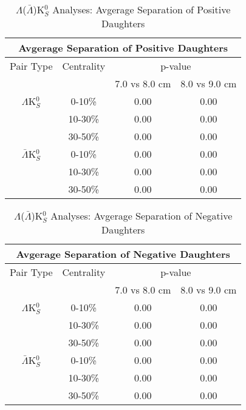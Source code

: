 \documentclass[../AnalysisNoteJBuxton.tex]{subfiles}
\begin{document}
\begin{table}
 \centering
 \begin{tabular}{|c|c|c|c|}
 \multicolumn{4}{c}{Avgerage Separation of Positive Daughters} \\
  \hline
  Pair Type & Centrality & \multicolumn{2}{c|}{p-value} \\
  \cline{3-4}
   & & 7.0 vs 8.0 cm & 8.0 vs 9.0 cm \\
  \hline
  $\Lambda$K$^{0}_{S}$ & 0-10\% & 0.00 & 0.00 \\
   & 10-30\% & 0.00 & 0.00 \\
   & 30-50\% & 0.00 & 0.00 \\
  \hline
  $\bar{\Lambda}$K$^{0}_{S}$ & 0-10\% & 0.00 & 0.00 \\
   & 10-30\% & 0.00 & 0.00 \\
   & 30-50\% & 0.00 & 0.00 \\
  \hline
 \end{tabular}
 \caption{$\Lambda$($\bar{\Lambda}$)K$^{0}_{S}$ Analyses: Avgerage Separation of Positive Daughters}
 \label{tab:AvgSepPosPosLamK0}
\end{table}

\begin{table}
 \centering
 \begin{tabular}{|c|c|c|c|}
 \multicolumn{4}{c}{Avgerage Separation of Negative Daughters} \\
  \hline
  Pair Type & Centrality & \multicolumn{2}{c|}{p-value} \\
  \cline{3-4}
   & & 7.0 vs 8.0 cm & 8.0 vs 9.0 cm \\
  \hline
  $\Lambda$K$^{0}_{S}$ & 0-10\% & 0.00 & 0.00 \\
   & 10-30\% & 0.00 & 0.00 \\
   & 30-50\% & 0.00 & 0.00 \\
  \hline
  $\bar{\Lambda}$K$^{0}_{S}$ & 0-10\% & 0.00 & 0.00 \\
   & 10-30\% & 0.00 & 0.00 \\
   & 30-50\% & 0.00 & 0.00 \\
  \hline
 \end{tabular}
 \caption{$\Lambda$($\bar{\Lambda}$)K$^{0}_{S}$ Analyses: Avgerage Separation of Negative Daughters}
 \label{tab:AvgSepNegNegLamK0}
\end{table}
\end{document}
